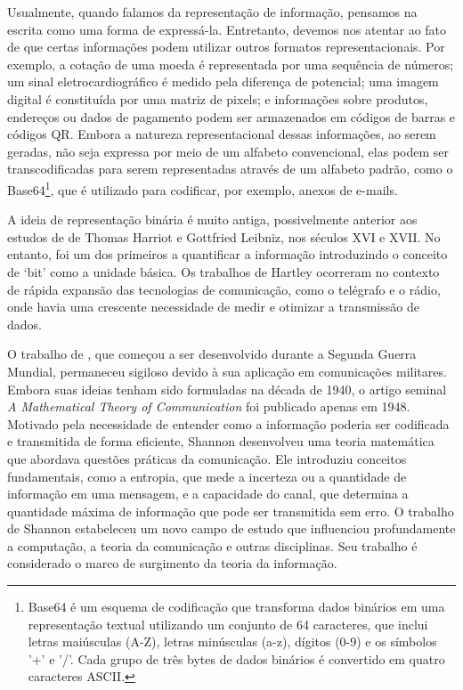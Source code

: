 Usualmente, quando falamos da representação de informação, pensamos na escrita
como uma forma de expressá-la. Entretanto, devemos nos atentar ao fato de que
certas informações podem utilizar outros formatos representacionais. Por
exemplo, a cotação de uma moeda é representada por uma sequência de números; um
sinal eletrocardiográfico é medido pela diferença de potencial; uma imagem
digital é constituída por uma matriz de pixels; e informações sobre produtos,
endereços ou dados de pagamento podem ser armazenados em códigos de barras e
códigos QR.  Embora a natureza representacional dessas informações, ao serem
geradas, não seja expressa por meio de um alfabeto convencional, elas podem ser
transcodificadas para serem representadas através de um alfabeto padrão, como o
Base64\footnote{Base64 é um esquema de codificação que transforma dados
    binários em uma representação textual utilizando um conjunto de 64
    caracteres, que inclui letras maiúsculas (A-Z), letras minúsculas (a-z),
    dígitos (0-9) e os símbolos '+' e '/'. Cada grupo de três bytes de dados
binários é convertido em quatro caracteres ASCII.}, que é utilizado para
codificar, por exemplo, anexos de e-mails.

A ideia de representação binária é muito antiga, possivelmente anterior 
aos estudos de de Thomas Harriot e Gottfried Leibniz, nos séculos XVI e XVII.
No entanto,
\textcite{hartley1928} foi um dos primeiros a quantificar a informação 
introduzindo o conceito de `bit' como a unidade básica. 
Os trabalhos de Hartley ocorreram no contexto de rápida expansão das
tecnologias de comunicação, como o telégrafo e o rádio, onde havia uma
crescente necessidade de medir e otimizar a transmissão de dados.

O trabalho de \textcite{shannon1948}, que começou a ser desenvolvido durante a
Segunda Guerra Mundial, permaneceu sigiloso devido à sua aplicação em
comunicações militares. Embora suas ideias tenham sido formuladas na década de
1940, o artigo seminal \emph{A Mathematical Theory of Communication} foi
publicado apenas em 1948.  Motivado pela necessidade de entender como a
informação poderia ser codificada e transmitida de forma eficiente, Shannon
desenvolveu uma teoria matemática que abordava questões práticas da
comunicação. Ele introduziu conceitos fundamentais, como a entropia, que mede a
incerteza ou a quantidade de informação em uma mensagem, e a capacidade do
canal, que determina a quantidade máxima de informação que pode ser transmitida
sem erro. O trabalho de Shannon estabeleceu um novo campo de estudo que
influenciou profundamente a computação, a teoria da comunicação e outras
disciplinas. Seu trabalho é considerado o marco de surgimento da teoria da
informação.

